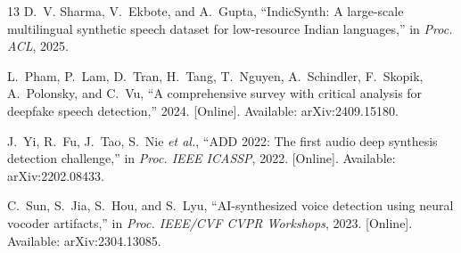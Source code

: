 \documentclass[conference]{IEEEtran}
\begin{document}
\begin{thebibliography}{13}
D.~V. Sharma, V.~Ekbote, and A.~Gupta, ``IndicSynth: A large-scale
  multilingual synthetic speech dataset for low-resource Indian
  languages,'' in \emph{Proc. ACL}, 2025.

L.~Pham, P.~Lam, D.~Tran, H.~Tang, T.~Nguyen, A.~Schindler, F.~Skopik,
  A.~Polonsky, and C.~Vu, ``A comprehensive survey with critical
  analysis for deepfake speech detection,'' 2024. [Online]. Available:
  arXiv:2409.15180.

J.~Yi, R.~Fu, J.~Tao, S.~Nie \emph{et al.}, ``ADD 2022: The first audio
  deep synthesis detection challenge,'' in \emph{Proc. IEEE ICASSP},
  2022. [Online]. Available: arXiv:2202.08433.

C.~Sun, S.~Jia, S.~Hou, and S.~Lyu, ``AI-synthesized voice detection
  using neural vocoder artifacts,'' in \emph{Proc. IEEE/CVF CVPR
  Workshops}, 2023. [Online]. Available: arXiv:2304.13085.

\end{thebibliography}
\end{document}
